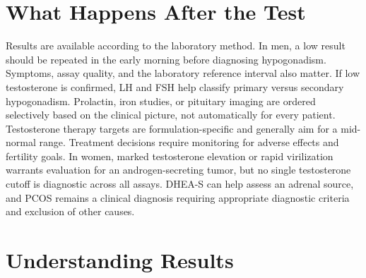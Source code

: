 \section*{What Happens After the Test}
Results are available according to the laboratory method. In men, a low result should be repeated in the early morning before diagnosing hypogonadism. Symptoms, assay quality, and the laboratory reference interval also matter. If low testosterone is confirmed, LH and FSH help classify primary versus secondary hypogonadism. Prolactin, iron studies, or pituitary imaging are ordered selectively based on the clinical picture, not automatically for every patient. Testosterone therapy targets are formulation-specific and generally aim for a mid-normal range. Treatment decisions require monitoring for adverse effects and fertility goals. In women, marked testosterone elevation or rapid virilization warrants evaluation for an androgen-secreting tumor, but no single testosterone cutoff is diagnostic across all assays. DHEA-S can help assess an adrenal source, and PCOS remains a clinical diagnosis requiring appropriate diagnostic criteria and exclusion of other causes.

\section*{Understanding Results}

